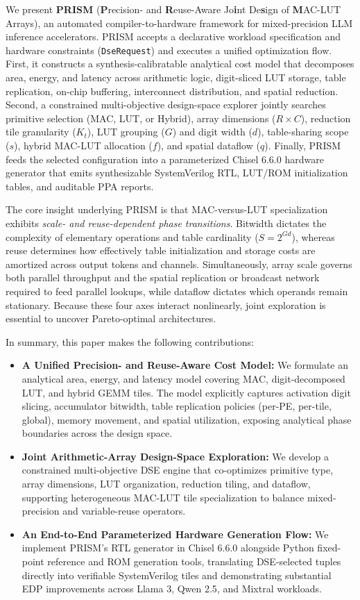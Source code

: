 \documentclass[10pt,letterpaper,twocolumn]{article}
\begin{document}
We present \textbf{PRISM} (\textbf{P}recision- and \textbf{R}euse-Aware Jo\textbf{i}nt De\textbf{s}ign of \textbf{M}AC-LUT Arrays), an automated compiler-to-hardware framework for mixed-precision LLM inference accelerators. PRISM accepts a declarative workload specification and hardware constraints (\texttt{DseRequest}) and executes a unified optimization flow. First, it constructs a synthesis-calibratable analytical cost model that decomposes area, energy, and latency across arithmetic logic, digit-sliced LUT storage, table replication, on-chip buffering, interconnect distribution, and spatial reduction. Second, a constrained multi-objective design-space explorer jointly searches primitive selection (MAC, LUT, or Hybrid), array dimensions ($R \times C$), reduction tile granularity ($K_t$), LUT grouping ($G$) and digit width ($d$), table-sharing scope ($s$), hybrid MAC-LUT allocation ($f$), and spatial dataflow ($q$). Finally, PRISM feeds the selected configuration into a parameterized Chisel 6.6.0 hardware generator that emits synthesizable SystemVerilog RTL, LUT/ROM initialization tables, and auditable PPA reports.

The core insight underlying PRISM is that MAC-versus-LUT specialization exhibits \emph{scale- and reuse-dependent phase transitions}. Bitwidth dictates the complexity of elementary operations and table cardinality ($S = 2^{Gd}$), whereas reuse determines how effectively table initialization and storage costs are amortized across output tokens and channels. Simultaneously, array scale governs both parallel throughput and the spatial replication or broadcast network required to feed parallel lookups, while dataflow dictates which operands remain stationary. Because these four axes interact nonlinearly, joint exploration is essential to uncover Pareto-optimal architectures.

In summary, this paper makes the following contributions:
\begin{itemize}
  \setlength{\itemsep}{1pt}\setlength{\parskip}{0pt}
  \item \textbf{A Unified Precision- and Reuse-Aware Cost Model:} We formulate an analytical area, energy, and latency model covering MAC, digit-decomposed LUT, and hybrid GEMM tiles. The model explicitly captures activation digit slicing, accumulator bitwidth, table replication policies (per-PE, per-tile, global), memory movement, and spatial utilization, exposing analytical phase boundaries across the design space.
  \item \textbf{Joint Arithmetic-Array Design-Space Exploration:} We develop a constrained multi-objective DSE engine that co-optimizes primitive type, array dimensions, LUT organization, reduction tiling, and dataflow, supporting heterogeneous MAC-LUT tile specialization to balance mixed-precision and variable-reuse operators.
  \item \textbf{An End-to-End Parameterized Hardware Generation Flow:} We implement PRISM's RTL generator in Chisel 6.6.0 alongside Python fixed-point reference and ROM generation tools, translating DSE-selected tuples directly into verifiable SystemVerilog tiles and demonstrating substantial EDP improvements across Llama 3, Qwen 2.5, and Mixtral workloads.
\end{itemize}
\end{document}
